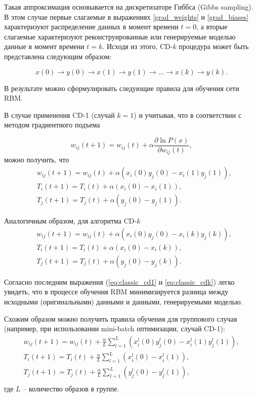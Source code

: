 Такая аппроксимация основывается на дискретизаторе Гиббса (Gibbs sampling). В этом случае первые слагаемые в выражениях \ref{grad_weights} и \ref{grad_biases} характеризуют распределение данных в момент времени $t=0$, а вторые слагаемые характеризуют реконструированные или генерируемые моделью данные в момент времени $t=k$. Исходя из этого, CD-$k$ процедура может быть представлена следующим образом:
	
\begin{equation}
	x(0) \rightarrow y(0) \rightarrow x(1) \rightarrow y(1) \rightarrow \ldots \rightarrow x(k) \rightarrow y(k).
\end{equation}
	
В результате можно сформулировать следующие правила для обучения сети RBM. 

В случае применения CD-1 (случай $k=1$) и учитывая, что в соответствии с методом градиентного подъема
	
\begin{equation*}
	w_{ij}(t+1)=w_{ij}(t)+\alpha\frac{\partial \ln P(x)}{\partial w_{ij}(t)},
\end{equation*}	 
можно получить, что
\begin{equation}
	\label{eq:classic_cd1}
	\begin{aligned}
		& w_{ij}(t+1)=w_{ij}(t)+\alpha(x_i(0)y_j(0)-x_i(1)y_j(1)),\\		
		& T_i(t+1)=T_i(t)+\alpha(x_i(0)-x_i(1)),\\	
		& T_j(t+1)=T_j(t)+\alpha(y_j(0)-y_j(1)).
	\end{aligned}		
\end{equation}

	Аналогичным образом, для алгоритма  CD-$k$
\begin{equation}
	\label{eq:classic_cdk}
	\begin{aligned}
		& w_{ij}(t+1)=w_{ij}(t)+\alpha(x_i(0)y_j(0)-x_i(k)y_j(k)),\\
		& T_i(t+1)=T_i(t)+\alpha(x_i(0)-x_i(k)),\\		
		& T_j(t+1)=T_j(t)+\alpha(y_j(0)-y_j(k)).
	\end{aligned}
\end{equation} 
	
Согласно последним выражения (\ref{eq:classic_cd1} и \ref{eq:classic_cdk}) легко увидеть, что в процессе обучения RBM минимизируется разница между исходными (оригинальными) данными и данными, генерируемыми моделью.

Схожим образом можно получить правила обучения для группового случая (например, при использовании mini-batch оптимизации, случай \mbox{CD-1}):
\begin{gather*}
		w_{ij}(t+1)=w_{ij}(t)+\frac{\alpha}{L}\sum_{l=1}^L(x_i^l(0)y_j^l(0)-x_i^l(1)y_j^l(1)),\\	
		T_i(t+1)=T_i(t)+\frac{\alpha}{L}\sum_{l=1}^L(x_i^l(0)-x_i^l(1)),\\
		T_j(t+1)=T_j(t)+\frac{\alpha}{L}\sum_{l=1}^L(y_j^l(0)-y_j^l(1)),\\
\end{gather*}	
где $L$ -- количество образов в группе.
	
